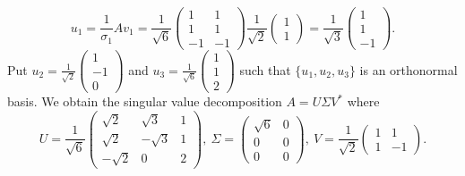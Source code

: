 \begin{Exercise}
\begin{enumerate}[(a)]
\begin{solution}
			$$
			u_1 = \frac{1}{\sigma_1}A v_1 = \frac{1}{\sqrt{6}} \begin{pmatrix}
			1 & 1 \\
			1 & 1 \\
			-1 & -1
			\end{pmatrix} \dfrac{1}{\sqrt{2}}\begin{pmatrix}
			1 \\
			1
			\end{pmatrix} = \frac{1}{\sqrt{3}}\begin{pmatrix}
			1 \\
			1 \\
			-1
			\end{pmatrix}.
			$$
			Put $u_2 = \frac{1}{\sqrt{2}}\begin{pmatrix}
			1 \\
			-1 \\
			0
			\end{pmatrix}$ and $u_3 = \frac{1}{\sqrt{6}}\begin{pmatrix}
			1 \\
			1 \\
			2
			\end{pmatrix}$ such that $\{u_1, u_2, u_3\}$ is an orthonormal basis.
			We obtain the singular value decomposition $A = U\Sigma V^*$ where
			$$
			U = \frac{1}{\sqrt{6}}\begin{pmatrix}
			\sqrt{2} & \sqrt{3} & 1 \\
			\sqrt{2} & -\sqrt{3} & 1 \\
			-\sqrt{2} & 0 & 2
			\end{pmatrix},~ \Sigma = \begin{pmatrix}
			\sqrt{6} & 0 \\
			0 & 0 \\
			0 & 0
			\end{pmatrix},~ V = \frac{1}{\sqrt{2}}\begin{pmatrix}
			1 & 1 \\
			1 & -1
			\end{pmatrix}.
			$$ 
		\end{solution}
		

\end{enumerate}
\end{Exercise}
